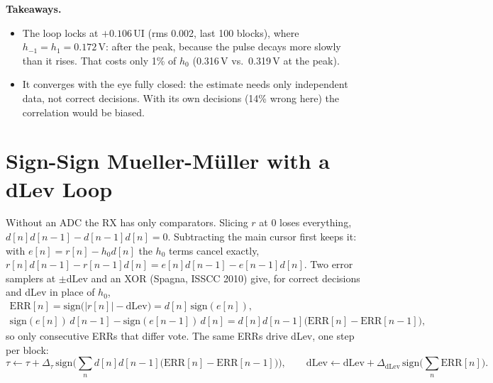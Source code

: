 \documentclass[10pt]{article}
\begin{document}
\noindent\textbf{Takeaways.}
\begin{itemize}\itemsep0pt
  \item The loop locks at $+0.106$\,UI (rms 0.002, last 100 blocks), where
        $h_{-1} = h_1 = 0.172$\,V: after the peak, because the pulse decays more slowly than it
        rises. That costs only 1\% of $h_0$ (0.316\,V vs.\ 0.319\,V at the peak).
  \item It converges with the eye fully closed: the estimate needs only independent data, not
        correct decisions. With its own decisions (14\% wrong here) the correlation would be biased.
\end{itemize}

\clearpage
\section*{Sign-Sign Mueller-M\"uller with a dLev Loop}
Without an ADC the RX has only comparators. Slicing $r$ at 0 loses everything,
$d[n]d[n-1] - d[n-1]d[n] = 0$. Subtracting the main cursor first keeps it: with
$e[n] = r[n] - h_0 d[n]$ the $h_0$ terms cancel exactly,
$r[n]d[n-1] - r[n-1]d[n] = e[n]d[n-1] - e[n-1]d[n]$. Two error samplers at $\pm$dLev and an XOR
(Spagna, ISSCC 2010) give, for correct decisions and dLev in place of $h_0$,
\begin{gather*}
  \mathrm{ERR}[n] = \mathrm{sign}\big(|r[n]| - \mathrm{dLev}\big) = d[n]\,\mathrm{sign}(e[n]),\\
  \mathrm{sign}(e[n])\,d[n-1] - \mathrm{sign}(e[n-1])\,d[n] = d[n]d[n-1]\big(\mathrm{ERR}[n] - \mathrm{ERR}[n-1]\big),
\end{gather*}
so only consecutive ERRs that differ vote. The same ERRs drive dLev, one step per block:
\[
  \tau \leftarrow \tau + \Delta_\tau\,\mathrm{sign}\Big(\textstyle\sum_n d[n]d[n-1]\big(\mathrm{ERR}[n]-\mathrm{ERR}[n-1]\big)\Big),
  \qquad
  \mathrm{dLev} \leftarrow \mathrm{dLev} + \Delta_{\mathrm{dLev}}\,\mathrm{sign}\Big(\textstyle\sum_n \mathrm{ERR}[n]\Big).
\]
\end{document}
